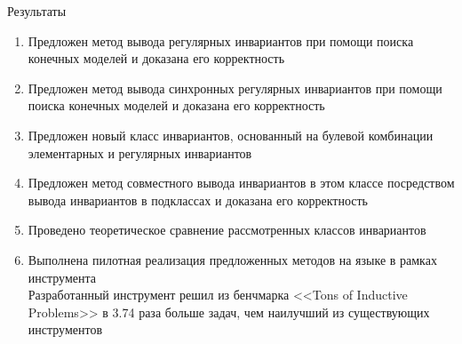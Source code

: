 \begin{frame}{Результаты}
\begin{enumerate}
\item Предложен метод вывода регулярных инвариантов при помощи поиска конечных моделей и доказана его корректность
\item Предложен метод вывода синхронных регулярных инвариантов при помощи поиска конечных моделей и доказана его корректность
\item Предложен новый класс инвариантов, основанный на булевой комбинации элементарных и регулярных инвариантов
\item Предложен метод совместного вывода инвариантов в этом классе посредством вывода инвариантов в подклассах и доказана его корректность
\item Проведено теоретическое сравнение рассмотренных классов инвариантов
\item Выполнена пилотная реализация предложенных методов на языке \fsharp{} в рамках инструмента \theringen{}\\Разработанный инструмент решил из бенчмарка <<Tons of Inductive Problems>> в 3.74 раза больше задач, чем наилучший из существующих инструментов
\end{enumerate}
\end{frame}